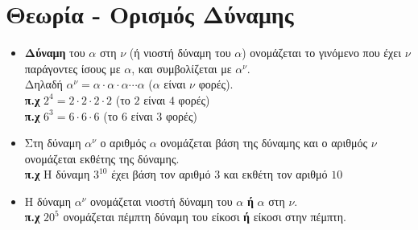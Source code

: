 \documentclass[a4paper,10pt]{report}
\begin{document}
\section*{Θεωρία - Ορισμός Δύναμης\hfill \small{}}
\begin{itemize}
 \item \textbf{Δύναμη} του $α$ στη $ν$ (ή νιοστή δύναμη του $α$) ονομάζεται το γινόμενο που έχει $ν$ παράγοντες 
       ίσους με $α$, και συμβολίζεται με  $α^{ν}$.\\
       Δηλαδή $α^{ν}=α\cdot α\cdot α \cdots α$ ($α$ είναι $ν$ φορές).\\
       \textbf{π.χ } $2^{4}=2\cdot 2\cdot 2\cdot 2 $ (το $2$ είναι $4$ φορές)\\
       \textbf{π.χ } $6^{3}=6\cdot 6\cdot 6$ (το $6$ είναι $3$ φορές)
 \item Στη δύναμη $α^{ν}$ ο αριθμός $α$ ονομάζεται βάση της δύναμης και ο αριθμός $ν$ ονομάζεται εκθέτης της δύναμης.\\
\textbf{π.χ } Η δύναμη $3^{10}$ έχει βάση τον αριθμό $3$ και εκθέτη τον αριθμό $10$
 \item Η δύναμη $α^{ν}$ ονομάζεται νιοστή δύναμη του $α$ \textbf{ή} $α$ στη $ν$.\\
\textbf{π.χ } $20^{5}$ ονομάζεται πέμπτη δύναμη του είκοσι \textbf{ή} είκοσι στην πέμπτη.
\end{itemize}
\end{document}
